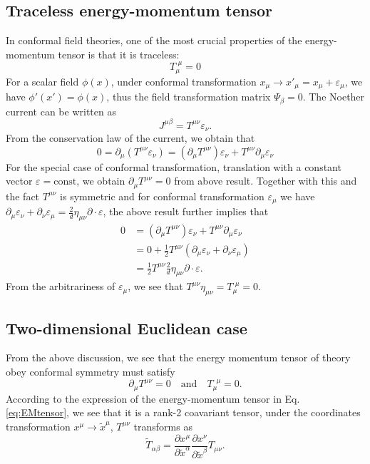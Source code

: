 \documentclass[graybox,envcountchap,sectrefs]{svmono}
\begin{document}
\subsection{Traceless energy-momentum tensor}
In conformal field theories, one of the most crucial properties of the energy-momentum tensor is that it is traceless: 
\begin{equation}
\boxed{	T_{\mu}^{\,\,\mu}=0}
\end{equation}
For a scalar field $\phi(x)$, under conformal transformation $x_{\mu}\to x'_{\mu}=x_{\mu}+\varepsilon_{\mu}$, we have $\phi'(x')=\phi(x)$, thus the field transformation matrix $\Psi_{\beta}=0$. The Noether current can be written as 
\begin{equation}
J^{\mu\beta}=T^{\mu\nu}\varepsilon_{\nu}.
\end{equation}
From the conservation law of the current, we obtain that
\begin{equation}
0=\partial_{\mu}	(T^{\mu\nu}\varepsilon_{\nu})
=(\partial_{\mu}T^{\mu\nu})	\varepsilon_{\nu}+
T^{\mu\nu}\partial_{\mu}\varepsilon_{\nu}
\end{equation}
For the special case of conformal transformation, translation with a constant vector $\varepsilon=\mathrm{const}$, we obtain $\partial_{\mu}T^{\mu\nu}=0$ from above result.
Together with this and the fact $T^{\mu\nu}$ is symmetric and for conformal transformation $\varepsilon_{\mu}$ we have $\partial_{\mu}\varepsilon_{\nu}+\partial_{\nu}\varepsilon_{\mu}=\frac{2}{d}\eta_{\mu\nu}\partial\cdot \varepsilon$, the above result further implies that
\begin{align}
0&=(\partial_{\mu}T^{\mu\nu})	\varepsilon_{\nu}+
T^{\mu\nu}\partial_{\mu}\varepsilon_{\nu}\nonumber\\
&=0+\frac{1}{2}T^{\mu\nu}(\partial_{\mu}\varepsilon_{\nu}+\partial_{\nu}\varepsilon_{\mu})	\nonumber\\
&=\frac{1}{2}T^{\mu\nu}\frac{2}{d}\eta_{\mu\nu}\partial\cdot \varepsilon.
\end{align}
From the arbitrariness of $\varepsilon_{\mu}$, we see that $T^{\mu\nu}\eta_{\mu\nu}=T_{\mu}^{\,\,\mu}=0$.

\subsection{Two-dimensional Euclidean case}
From the above discussion, we see that the energy momentum tensor of theory obey conformal symmetry must satisfy
\begin{equation}\label{eq:EMT}\boxed{
\partial_{\mu}T^{\mu\nu}=0\quad \text{and} \quad  T_{\mu}^{\,\,\,\mu}=0.	}
\end{equation}
According to the expression of the energy-momentum tensor in Eq. \ref{eq:EMtensor}, we see that it is a rank-2 coavariant tensor, under the coordinates transformation $x^{\mu}\to \tilde{x}^{\mu}$, $T^{\mu\nu}$ transforms as
\begin{equation}\label{eq:transEM}
\tilde{T}_{\alpha\beta}=\frac{\partial x^{\mu}}{\partial\tilde{x}^{\alpha}}	
\frac{\partial x^{\nu}}{\partial\tilde{x}^{\beta}}T_{\mu\nu}.
\end{equation}
\end{document}
